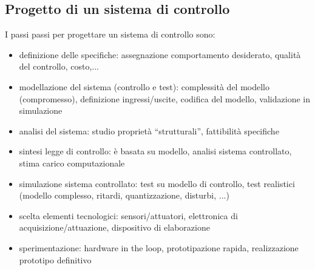 \documentclass{article}
\begin{document}
\subsection{Progetto di un sistema di controllo}
I passi passi per progettare un sistema di controllo sono:
\begin{itemize}
    \item definizione delle specifiche: assegnazione comportamento  desiderato, qualità del controllo, costo,...
    \item modellazione del sistema (controllo e test): complessità del modello (compromesso), definizione ingressi/uscite, codifica del modello, validazione in simulazione
    \item analisi del sistema: studio proprietà “strutturali”, fattibilità specifiche
    \item sintesi legge di controllo: è basata su modello, analisi sistema controllato, stima carico computazionale
    \item simulazione sistema controllato: test su modello di controllo, test realistici (modello complesso, ritardi, quantizzazione, disturbi, ...)
    \item scelta elementi tecnologici: sensori/attuatori, elettronica di acquisizione/attuazione, dispositivo di elaborazione
    \item sperimentazione: hardware in the loop, prototipazione rapida, realizzazione prototipo definitivo
\end{itemize}
\end{document}
